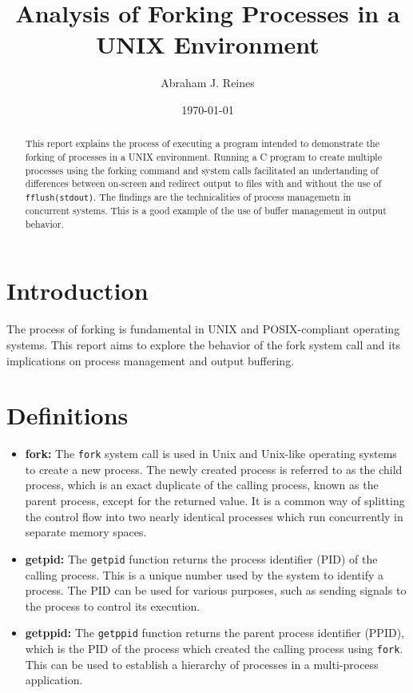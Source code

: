 \documentclass[12pt]{article}
\begin{document}
\title{Analysis of Forking Processes in a UNIX Environment}
\author{Abraham J. Reines}
\date{\today}

\maketitle

\begin{abstract}
This report explains the process of executing a program intended to demonstrate the forking of processes in a UNIX environment. Running a C program to create multiple processes using the forking command and system calls facilitated an undertanding of differences between on-screen and redirect output to files with and without the use of \texttt{fflush(stdout)}. The findings are the technicalities of process managemetn in concurrent systems. This is a good example of the use of buffer management in output behavior. 
\end{abstract}

\section{Introduction}
The process of forking is fundamental in UNIX and POSIX-compliant operating systems. This report aims to explore the behavior of the fork system call and its implications on process management and output buffering.

\section{Definitions}

\begin{itemize}
    \item \textbf{fork:} The \texttt{fork} system call is used in Unix and Unix-like operating systems to create a new process. The newly created process is referred to as the child process, which is an exact duplicate of the calling process, known as the parent process, except for the returned value. It is a common way of splitting the control flow into two nearly identical processes which run concurrently in separate memory spaces.
    \item \textbf{getpid:} The \texttt{getpid} function returns the process identifier (PID) of the calling process. This is a unique number used by the system to identify a process. The PID can be used for various purposes, such as sending signals to the process to control its execution.
    \item \textbf{getppid:} The \texttt{getppid} function returns the parent process identifier (PPID), which is the PID of the process which created the calling process using \texttt{fork}. This can be used to establish a hierarchy of processes in a multi-process application.
\end{itemize}
\end{document}
